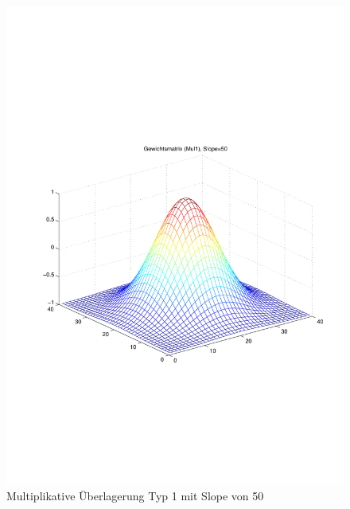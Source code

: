 \begin{figure}[hbt]
\begin{minipage}{0.5 \textwidth}
		\includegraphics[width=\textwidth]{./Bilder/Auswertung/Gewichtsmatrix/Gewichtsmatrix_Mul1_Slope_50}
		\caption{Multiplikative Überlagerung Typ 1 mit Slope von 50}
		\label{Mul150}
	\end{minipage}
\end{figure}

